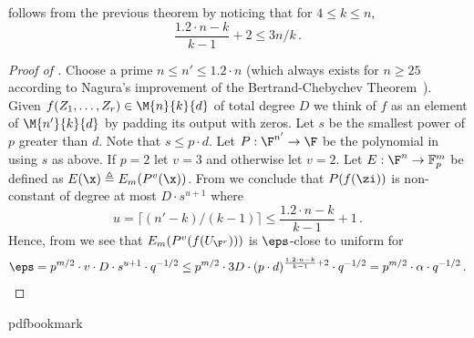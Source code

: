  follows
from the previous theorem by noticing that for $4\leq k \leq n$,
\[\frac{1.2\cdot n-k}{k-1} +2 \leq 3n/k\,.\]

\begin{proof}[Proof of ]
Choose a prime $n\leq n'\leq 1.2\cdot n$ (which always exists for $n\geq 25 $ according to Nagura's improvement of the
Bertrand-Chebychev Theorem~\cite{Na52}).
Given $f(Z_1,\ldots,Z_r)\in \M{n}{k}{d}$ of total degree $D$ we think of $f$ as an element of $ \M{n'}{k}{d}$
by padding its output with zeros.
Let $s$ be the smallest power of $p$ greater than $d$.
Note that $s\leq p\cdot d$.
Let $P:\F^{n'}\to \F$ be the polynomial in  using $s$ as above.
If $p=2$ let $v=3$ and otherwise let $v=2$.
Let $E:\F^n\to \mathbb{F}_p^m$ be defined as $E(\x)\triangleq E_m(P^v(\x))$.
{}From  we conclude that $P(f(\zi))$ is non-constant of degree at most $D\cdot s^{u+1}$
where 
\[
u= \lceil (n'-k)/(k-1)\rceil \leq  \frac{ 1.2\cdot n-k}{k-1} + 1\,.
\]
Hence, from  we see that $E_m(P^v(f(U_{\F^r})))$ is $\eps$-close to uniform
for
\[\eps = p^{m/2}\cdot v\cdot D\cdot s^{u+1}\cdot q^{-1/2}\leq
p^{m/2}\cdot 3 D \cdot (p\cdot d)^{\frac{1.2\cdot n-k}{k-1} +2}\cdot q^{-1/2}
=p^{m/2}\cdot \alpha\cdot q^{-1/2}\,.\qedhere\]
\end{proof}

%
%
%
%
%
\providecommand{\bibhead}[1]{}
%
\expandafter\ifx\csname pdfbookmark\endcsname\relax%
  \providecommand{\tocrefpdfbookmark}{}
\else\providecommand{\tocrefpdfbookmark}{%
   \hypertarget{tocreferences}{}%
   \pdfbookmark[1]{References}{tocreferences}}%
\fi

